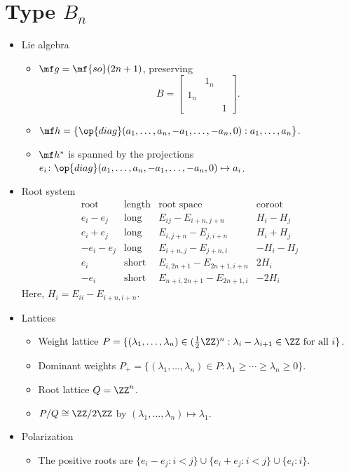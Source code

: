 \documentclass{article}
\begin{document}
\section{Type \texorpdfstring{$B_n$}{ B n}}
\begin{itemize}
	\item Lie algebra
	\begin{itemize}
		\item $\mf g=\mf{so}(2n+1)$, preserving
		\[B=\begin{bmatrix}
			& 1_n \\ 1_n \\ && 1
		\end{bmatrix}.\]
		\item $\mf h=\{\op{diag}(a_1,\ldots,a_n,-a_1,\ldots,-a_n,0):a_1,\ldots,a_n\}$.
		\item $\mf h^*$ is spanned by the projections $e_i\colon\op{diag}(a_1,\ldots,a_n,-a_1,\ldots,-a_n,0)\mapsto a_i$.
	\end{itemize}
	\item Root system
	\[\begin{array}{c|cccccc}
		\text{root} & \text{length} & \text{root space} & \text{coroot}\\\hline
		e_i-e_j & \text{long} & E_{ij}-E_{i+n,j+n} & H_i-H_j\\
		e_i+e_j & \text{long} & E_{i,j+n}-E_{j,i+n} & H_i+H_j\\
		-e_i-e_j & \text{long} & E_{i+n,j}-E_{j+n,i} & -H_i-H_j \\
		e_i & \text{short} & E_{i,2n+1}-E_{2n+1,i+n} & 2H_i \\
		-e_i & \text{short} & E_{n+i,2n+1}-E_{2n+1,i} & -2H_i
	\end{array}\]
	Here, $H_i=E_{ii}-E_{i+n,i+n}$.
	\item Lattices
	\begin{itemize}
		\item Weight lattice $P=\{(\lambda_1,\ldots,\lambda_{n})\in(\frac12\ZZ)^n:\lambda_i-\lambda_{i+1}\in\ZZ\text{ for all }i\}$.
		\item Dominant weights $P_+=\{(\lambda_1,\ldots,\lambda_n)\in P:\lambda_1\ge\cdots\ge\lambda_n\ge0\}$.
		\item Root lattice $Q=\ZZ^n$.
		\item $P/Q\cong\ZZ/2\ZZ$ by $(\lambda_1,\ldots,\lambda_n)\mapsto\lambda_1$.
	\end{itemize}
	\item Polarization
	\begin{itemize}
		\item The positive roots are $\{e_i-e_j:i<j\}\cup\{e_i+e_j:i<j\}\cup\{e_i:i\}$.

\end{itemize}
\end{itemize}
\end{document}
